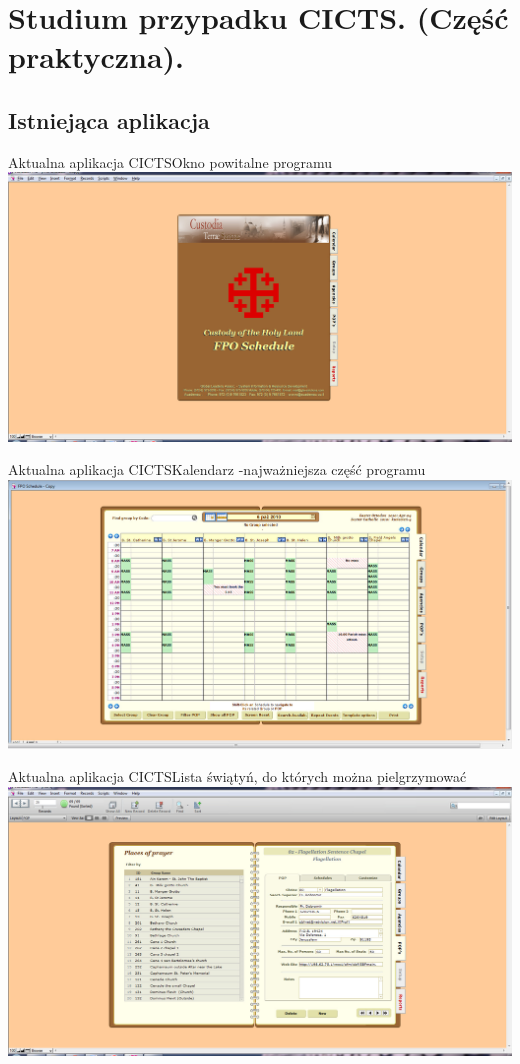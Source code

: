 \section[Studium przypadku CICTS]{Studium przypadku CICTS. (Część praktyczna).}

\subsection{Istniejąca aplikacja}

\begin{frame}{Aktualna aplikacja CICTS}{Okno powitalne programu}
   \includegraphics[width=1.0\linewidth]{FPOSchedule1.jpg}
\end{frame}

\begin{frame}{Aktualna aplikacja CICTS}{Kalendarz -najważniejsza część programu}
   \includegraphics[width=1.0\linewidth]{FPOSchedule2.jpg}
\end{frame}

\begin{frame}{Aktualna aplikacja CICTS}{Lista świątyń, do których można pielgrzymować}
   \includegraphics[width=1.0\linewidth]{FPOSchedule3.jpg}
\end{frame}

